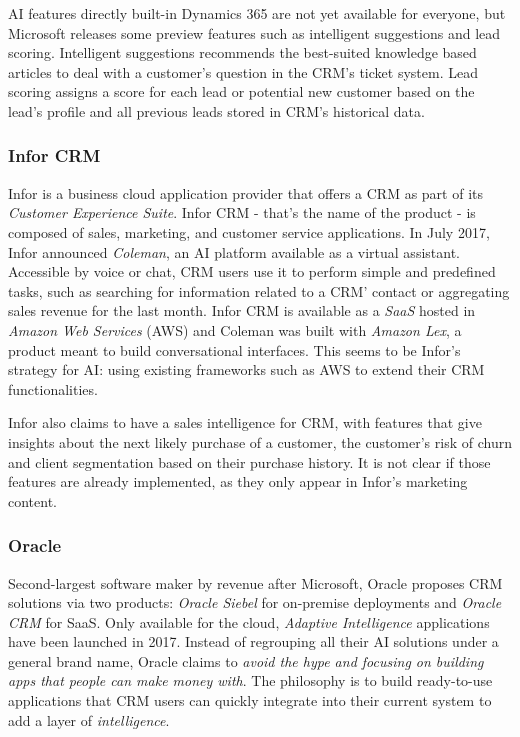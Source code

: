 AI features directly built-in Dynamics 365 are not yet available for everyone, but Microsoft releases some preview features such as intelligent suggestions and lead scoring. Intelligent suggestions recommends the best-suited knowledge based articles to deal with a customer's question in the CRM's ticket system. Lead scoring assigns a score for each lead or potential new customer based on the lead's profile and all previous leads stored in CRM's historical data.

\subsubsection*{Infor CRM}
Infor is a business cloud application provider that offers a CRM as part of its \textit{Customer Experience Suite}. Infor CRM - that's the name of the product - is composed of sales, marketing, and customer service applications. In July 2017, Infor announced \textit{Coleman}, an AI platform available as a virtual assistant. Accessible by voice or chat, CRM users use it to perform simple and predefined tasks, such as searching for information related to a CRM' contact or aggregating sales revenue for the last month. Infor CRM is available as a \textit{SaaS} hosted in \textit{Amazon Web Services} (AWS) and Coleman was built with \textit{Amazon Lex}, a product meant to build conversational interfaces. This seems to be Infor's strategy for AI: using existing frameworks such as AWS to extend their CRM functionalities.

Infor also claims to have a sales intelligence for CRM, with features that give insights about the next likely purchase of a customer, the customer's risk of churn and client segmentation based on their purchase history. It is not clear if those features are already implemented, as they only appear in Infor's marketing content.\nocite{infor-website}


\subsubsection*{Oracle}
Second-largest software maker by revenue after Microsoft, Oracle proposes CRM solutions via two products: \textit{Oracle Siebel} for on-premise deployments and \textit{Oracle CRM} for SaaS. Only available for the cloud, \textit{Adaptive Intelligence} applications have been launched in 2017. Instead of regrouping all their AI solutions under a general brand name, Oracle claims to \textit{avoid the hype and focusing on building apps that people can make money with}\cite{https://www.techemergence.com/crm-artificial-intelligence-trends-across-salesforce-oracle-sap/}. The philosophy is to build ready-to-use applications that CRM users can quickly integrate into their current system to add a layer of \textit{intelligence}.

